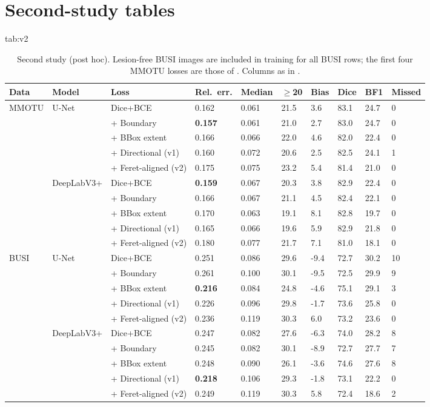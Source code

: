 \documentclass{midl}
\begin{document}
\section{Second-study tables}\label{app:v2}
\begin{table}[htbp]
\floatconts
  {tab:v2}
  {\caption{Second study (post hoc). Lesion-free BUSI images are included in training for all BUSI rows; the first four MMOTU losses are those of . Columns as in .}}
  {\scriptsize\setlength{\tabcolsep}{3pt}\begin{tabular}{llllllllll}
  \toprule
  Data & Model & Loss & Rel.\ err. & Median & $\ge$20 & Bias & Dice & BF1 & Missed\\
  \midrule
  \multirow{10}{*}{MMOTU} & \multirow{5}{*}{U-Net} & Dice+BCE & 0.162 & 0.061 & 21.5 & 3.6 & 83.1 & 24.7 & 0 \\
 &  & + Boundary & \textbf{0.157} & 0.061 & 21.0 & 2.7 & 83.0 & 24.7 & 0 \\
 &  & + BBox extent & 0.166 & 0.066 & 22.0 & 4.6 & 82.0 & 22.4 & 0 \\
 &  & + Directional (v1) & 0.160 & 0.072 & 20.6 & 2.5 & 82.5 & 24.1 & 1 \\
 &  & + Feret-aligned (v2) & 0.175 & 0.075 & 23.2 & 5.4 & 81.4 & 21.0 & 0 \\
\midrule
 & \multirow{5}{*}{DeepLabV3+} & Dice+BCE & \textbf{0.159} & 0.067 & 20.3 & 3.8 & 82.9 & 22.4 & 0 \\
 &  & + Boundary & 0.166 & 0.067 & 21.1 & 4.5 & 82.4 & 22.1 & 0 \\
 &  & + BBox extent & 0.170 & 0.063 & 19.1 & 8.1 & 82.8 & 19.7 & 0 \\
 &  & + Directional (v1) & 0.165 & 0.066 & 19.6 & 5.9 & 82.9 & 21.8 & 0 \\
 &  & + Feret-aligned (v2) & 0.180 & 0.077 & 21.7 & 7.1 & 81.0 & 18.1 & 0 \\
\midrule
\multirow{10}{*}{BUSI} & \multirow{5}{*}{U-Net} & Dice+BCE & 0.251 & 0.086 & 29.6 & -9.4 & 72.7 & 30.2 & 10 \\
 &  & + Boundary & 0.261 & 0.100 & 30.1 & -9.5 & 72.5 & 29.9 & 9 \\
 &  & + BBox extent & \textbf{0.216} & 0.084 & 24.8 & -4.6 & 75.1 & 29.1 & 3 \\
 &  & + Directional (v1) & 0.226 & 0.096 & 29.8 & -1.7 & 73.6 & 25.8 & 0 \\
 &  & + Feret-aligned (v2) & 0.236 & 0.119 & 30.3 & 6.0 & 73.2 & 23.6 & 0 \\
\midrule
 & \multirow{5}{*}{DeepLabV3+} & Dice+BCE & 0.247 & 0.082 & 27.6 & -6.3 & 74.0 & 28.2 & 8 \\
 &  & + Boundary & 0.245 & 0.082 & 30.1 & -8.9 & 72.7 & 27.7 & 7 \\
 &  & + BBox extent & 0.248 & 0.090 & 26.1 & -3.6 & 74.6 & 27.6 & 8 \\
 &  & + Directional (v1) & \textbf{0.218} & 0.106 & 29.3 & -1.8 & 73.1 & 22.2 & 0 \\
 &  & + Feret-aligned (v2) & 0.249 & 0.119 & 30.3 & 5.8 & 72.4 & 18.6 & 2 \\
  \bottomrule
  \end{tabular}}
\end{table}
\end{document}
